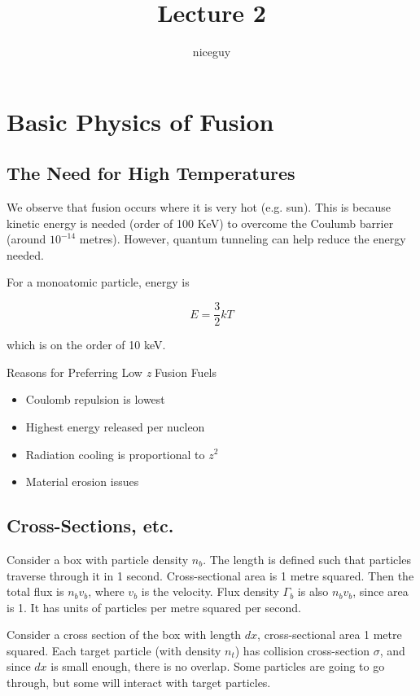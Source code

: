 \documentclass[12pt]{article}
\title{Lecture 2}
\author{niceguy}
\begin{document}
\maketitle

\section{Basic Physics of Fusion}

\subsection{The Need for High Temperatures}

We observe that fusion occurs where it is very hot (e.g. sun). This is because kinetic energy is needed (order of 100 KeV) to overcome the Coulumb barrier (around $10^{-14}$ metres). However, quantum tunneling can help reduce the energy needed.

For a monoatomic particle, energy is

\begin{equation}
    E = \frac{3}{2}kT
\end{equation}

which is on the order of 10 keV.

Reasons for Preferring Low \textit{z} Fusion Fuels

\begin{itemize}
    \item Coulomb repulsion is lowest
    \item Highest energy released per nucleon
    \item Radiation cooling is proportional to $z^2$
    \item Material erosion issues
\end{itemize}

\subsection{Cross-Sections, etc.}

Consider a box with particle density $n_b$. The length is defined such that particles traverse through it in 1 second. Cross-sectional area is 1 metre squared. Then the total flux is $n_bv_b$, where $v_b$ is the velocity. Flux density $\Gamma_b$ is also $n_bv_b$, since area is 1. It has units of particles per metre squared per second.

Consider a cross section of the box with length $dx$, cross-sectional area 1 metre squared. Each target particle (with density $n_t$) has collision cross-section $\sigma$, and since $dx$ is small enough, there is no overlap. Some particles are going to go through, but some will interact with target particles.
\end{document}
